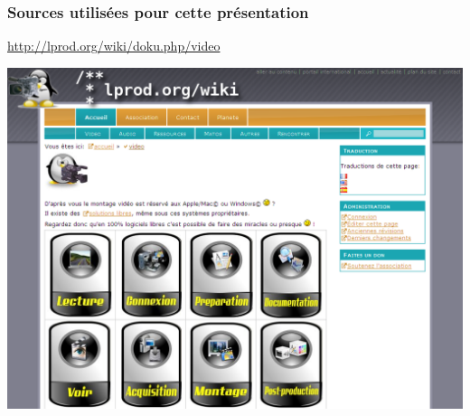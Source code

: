 \begin{frame}
\frametitle{Sources utilisées pour cette présentation}
\href{http://lprod.org/wiki/doku.php/video}{http://lprod.org/wiki/doku.php/video}

\includegraphics[scale=0.20]{ressources/LPROD.png}

\end{frame}



